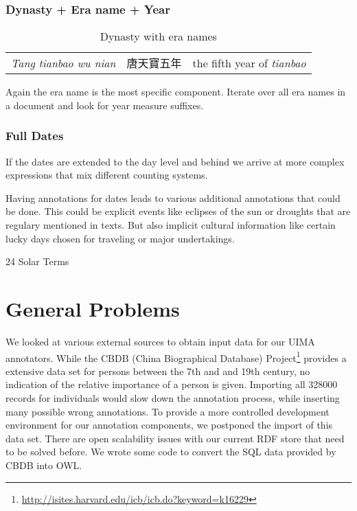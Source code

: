 \documentclass[12pt, draft]{article}
\begin{document}
\subsubsection{Dynasty + Era name + Year}

{\footnotesize
\begin{table}[h]
\caption{Dynasty with era names}
\begin{tabular}{lll}
\hline
\emph{Tang tianbao wu nian} & 唐天寶五年 & the fifth year of \emph{tianbao} \\
\end{tabular}
\end{table}
}

Again the era name is the most specific component. Iterate over all era names
in a document and look for year measure suffixes.

\subsubsection{Full Dates}
If the dates are extended to the day level and behind we arrive at more complex
expressions that mix different counting systems.


Having annotations for dates leads to various additional annotations that could
be done.  This could be explicit  events like eclipses of the sun or droughts that
are regulary mentioned in texts. But also implicit cultural information
like certain lucky days chosen for traveling or major undertakings.
 
24 Solar Terms

\section{General Problems}

We looked at various external sources to obtain
input data for our UIMA annotators.
While the 
CBDB (China Biographical Database) Project\footnote{\url{http://isites.harvard.edu/icb/icb.do?keyword=k16229}}
provides a extensive data set for persons between the 7th and and 19th century, 
no indication of the relative importance of a person is given.
Importing all 328000 records for individuals would slow down 
the annotation process, while inserting many possible wrong annotations.
To provide a more controlled development environment for our annotation
components, we postponed the import of this data set. There are open
scalability issues with our current RDF store that need to be solved before.
We wrote some code to convert the SQL data provided
by CBDB into OWL.
\end{document}
